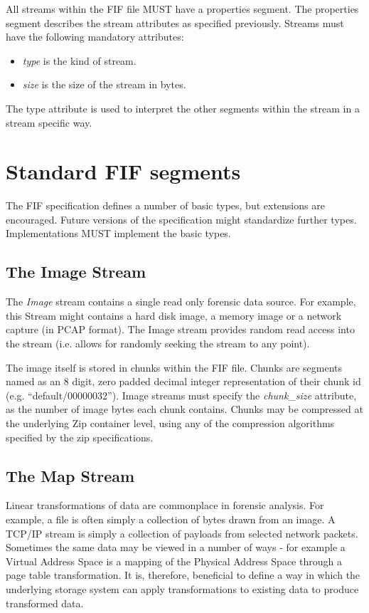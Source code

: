 \documentclass[12pt, conference]{IEEEtran}
\begin{document}
All streams within the FIF file MUST have a properties segment. The
properties segment describes the stream attributes as specified
previously. Streams must have the following mandatory attributes:

\begin{itemize}
\item {\em type} is the kind of stream.

\item {\em size} is the size of the stream in bytes.
\end{itemize}

The type attribute is used to interpret the other segments within the
stream in a stream specific way.

\section{Standard FIF segments}
The FIF specification defines a number of basic types, but extensions
are encouraged. Future versions of the specification might standardize
further types. Implementations MUST implement the basic types.

\subsection{The Image Stream}
The {\em Image} stream contains a single read only forensic data
source. For example, this Stream might contains a hard disk image, a
memory image or a network capture (in PCAP format). The Image stream
provides random read access into the stream (i.e. allows for randomly
seeking the stream to any point).

The image itself is stored in chunks within the FIF file. Chunks are
segments named as an 8 digit, zero padded decimal integer
representation of their chunk id (e.g. ``default/00000032''). Image
streams must specify the {\em chunk\_size} attribute, as the number of
image bytes each chunk contains. Chunks may be compressed at the
underlying Zip container level, using any of the compression
algorithms specified by the zip specifications.


\subsection{The Map Stream}
Linear transformations of data are commonplace in forensic
analysis. For example, a file is often simply a collection of bytes
drawn from an image. A TCP/IP stream is simply a collection of
payloads from selected network packets. Sometimes the same data may be
viewed in a number of ways - for example a Virtual Address Space is a
mapping of the Physical Address Space through a page table
transformation. It is, therefore, beneficial to define a way in which
the underlying storage system can apply transformations to existing
data to produce transformed data.
\end{document}
